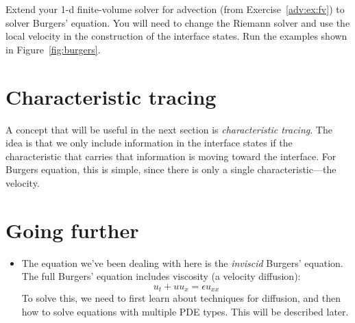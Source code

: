 \begin{exercise}
{Extend your 1-d finite-volume solver for advection (from Exercise~\ref{adv:ex:fv}) to solver Burgers' equation.  You will need to change the Riemann solver
and use the local velocity in the construction of the interface states.  Run
the examples shown in Figure~\ref{fig:burgers}}.
\end{exercise}

\section{Characteristic tracing}

A concept that will be useful in the next section is {\em
  characteristic tracing}.  The idea is that we only include
information in the interface states if the characteristic that carries
that information is moving toward the interface.  For Burgers equation,
this is simple, since there is only a single characteristic---the velocity.


\section{Going further}

\begin{itemize}
\item The equation we've been dealing with here is the {\em inviscid} Burgers' equation. 
The full Burgers' equation includes viscosity (a velocity diffusion):
\begin{equation}
u_t + u u_x = \epsilon u_{xx}
\end{equation}
To solve this, we need to first learn about techniques for diffusion, and then how to
solve equations with multiple PDE types.  This will be described later.

\end{itemize}
